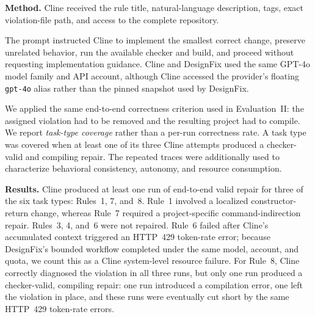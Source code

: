 \textbf{Method.}
Cline received the rule title, natural-language description, tags,
exact violation-file path, and access to the complete repository. 

The prompt instructed Cline to implement the smallest correct change,
preserve unrelated behavior, run the available checker and build, and
proceed without requesting implementation guidance. Cline and DesignFix used the same GPT-4o model family and API account,
although Cline accessed the provider's floating \texttt{gpt-4o} alias
rather than the pinned snapshot used by DesignFix.

We applied the same end-to-end correctness criterion used in
Evaluation~II: the assigned violation had to be removed and the
resulting project had to compile. We report \emph{task-type coverage} rather than
a per-run correctness rate. A task type was covered when at least one
of its three Cline attempts produced a checker-valid and compiling
repair. The repeated traces were additionally used to characterize
behavioral consistency, autonomy, and resource consumption. 

\textbf{Results.}
Cline produced at least one run of end-to-end valid repair for three of the six task types:
Rules~1, 7, and~8. Rule~1 involved a localized constructor-return change,
whereas Rule~7 required a project-specific command-indirection repair.
Rules~3, 4, and~6 were not repaired. Rule~6 failed after Cline's
accumulated context triggered an HTTP~429 token-rate error; because
DesignFix's bounded workflow completed under the same model, account,
and quota, we count this as a Cline system-level resource failure.
For Rule~8, Cline correctly diagnosed the violation in all three runs,
but only one run produced a checker-valid, compiling repair: one run
introduced a compilation error, one left the violation in place, and
these runs were eventually cut short by the same HTTP~429
token-rate errors.

